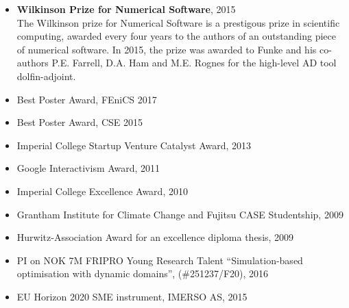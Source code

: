 \documentclass[11pt]{article}
\begin{document}
\begin{itemize}
\item {\textbf{Wilkinson Prize for Numerical Software}}, 2015\\
    The Wilkinson prize for Numerical Software is a prestigous prize in scientific computing, awarded every four years to the authors of an outstanding piece of numerical software.
    In 2015, the prize was awarded to Funke and his co-authors P.E. Farrell, D.A. Ham and M.E. Rognes for the high-level AD tool dolfin-adjoint.
\item Best Poster Award, FEniCS 2017
\item Best Poster Award, CSE 2015
\item Imperial College Startup Venture Catalyst Award, 2013
\item {Google Interactivism Award}, 2011
\item {Imperial College Excellence Award}, 2010%
\item {Grantham Institute for Climate Change and Fujitsu CASE Studentship}, 2009
\item Hurwitz-Association Award for an excellence diploma thesis, 2009
\end{itemize}

\begin{itemize}
\item PI on NOK 7M FRIPRO Young Research Talent ``Simulation-based optimisation with dynamic domains'', (\#251237/F20), 2016
\item EU Horizon 2020 SME instrument, IMERSO AS, 2015
\end{itemize}
\end{document}
